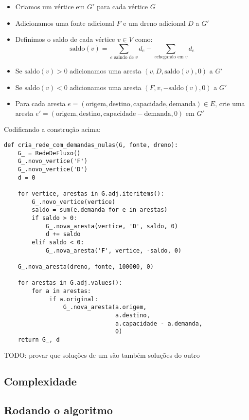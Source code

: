\documentclass[11pt]{article}
\begin{document}
\begin{itemize}
\item Criamos um vértice em $G'$ para cada vértice $G$
\item Adicionamos uma fonte adicional $F$ e um dreno adicional $D$ a $G'$
\item Definimos o saldo de cada vértice $v \in V$ como: \[
  \textrm{saldo}(v) = \sum_{e \text{ saindo de }v}d_e - \sum_{e \text{
  chegando em }v}d_e \]
\item Se $\mathrm{saldo}(v) > 0$ adicionamos uma aresta $(v, D,
  \mathrm{saldo}(v), 0)$ a $G'$
\item Se $\mathrm{saldo}(v) < 0$ adicionamos uma aresta $(F, v,
  -\mathrm{saldo}(v), 0)$ a $G'$
\item Para cada aresta $e = (\mathrm{origem, destino, capacidade,
  demanda}) \in E$, crie uma aresta $e' = (\mathrm{origem, destino,
  capacidade - demanda, 0})$ em $G'$
\end{itemize}

Codificando a construção acima:
\begin{verbatim}
def cria_rede_com_demandas_nulas(G, fonte, dreno):
    G_ = RedeDeFluxo()
    G_.novo_vertice('F')
    G_.novo_vertice('D')
    d = 0

    for vertice, arestas in G.adj.iteritems():
        G_.novo_vertice(vertice)
        saldo = sum(e.demanda for e in arestas)
        if saldo > 0:
            G_.nova_aresta(vertice, 'D', saldo, 0)
            d += saldo
        elif saldo < 0:
            G_.nova_aresta('F', vertice, -saldo, 0)

    G_.nova_aresta(dreno, fonte, 100000, 0)

    for arestas in G.adj.values():
        for a in arestas:
             if a.original:
                 G_.nova_aresta(a.origem,
                                a.destino,
                                a.capacidade - a.demanda,
                                0)
    return G_, d
\end{verbatim}

TODO: provar que soluções de um são também soluções do outro


\subsection{Complexidade}
\label{sec-3-4}

\subsection{Rodando o algoritmo}
\label{sec-3-5}
\end{document}
